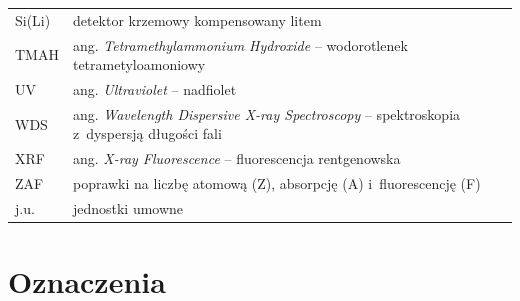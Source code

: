 \begin{tabular}{@{}lp{}@{}}
Si(Li)  & detektor krzemowy kompensowany litem \\
TMAH    & ang. \textit{Tetramethylammonium Hydroxide} -- wodorotlenek tetrametyloamoniowy \\
UV      & ang. \textit{Ultraviolet} -- nadfiolet \\
WDS     & ang. \textit{Wavelength Dispersive X-ray Spectroscopy} -- spektroskopia z~dyspersją długości fali \\
XRF     & ang. \textit{X-ray Fluorescence} -- fluorescencja rentgenowska \\
ZAF     & poprawki na liczbę atomową (Z), absorpcję (A) i~fluorescencję (F) \\
j.u.    & jednostki umowne \\
\bottomrule
\end{tabular}

\section*{Oznaczenia}

